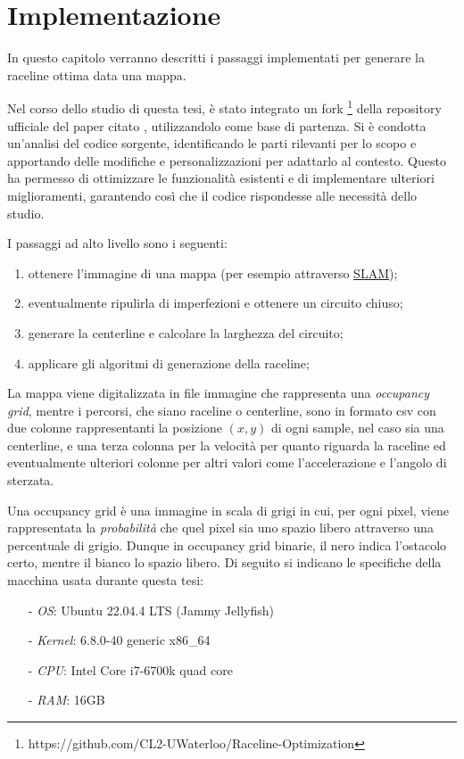 
\chapter{Implementazione}
\label{chap:impl}
In questo capitolo verranno descritti i passaggi implementati per generare la raceline ottima data una
mappa.

Nel corso dello studio di questa tesi, è stato integrato un fork
\footnote{https://github.com/CL2-UWaterloo/Raceline-Optimization} della repository ufficiale del paper
citato \cite{christ2021time}, utilizzandolo come base di partenza. Si è condotta un'analisi del codice
sorgente, identificando le parti rilevanti per lo scopo e apportando delle modifiche e
personalizzazioni per adattarlo al contesto. Questo ha permesso di ottimizzare le funzionalità
esistenti e di implementare ulteriori miglioramenti, garantendo così che il codice rispondesse alle
necessità dello studio.

\bigskip
\noindent I passaggi ad alto livello sono i seguenti:
\begin{enumerate}
	\item ottenere l'immagine di una mappa (per esempio attraverso \hyperref[par:slam]{SLAM});
	\item eventualmente ripulirla di imperfezioni e ottenere un circuito chiuso; 
	\item generare la centerline e calcolare la larghezza del circuito;
	\item applicare gli algoritmi di generazione della raceline;
\end{enumerate}
La mappa viene digitalizzata in file immagine che rappresenta una \textit{occupancy grid}, mentre i
percorsi, che siano raceline o centerline, sono in formato csv con due colonne rappresentanti la
posizione $(x,y)$ di ogni sample, nel caso sia una centerline, e una terza colonna per la velocità per
quanto riguarda la raceline ed eventualmente ulteriori colonne per altri valori come l'accelerazione e
l'angolo di sterzata.

Una occupancy grid è una immagine in scala di grigi in cui, per ogni pixel, viene rappresentata la
\textit{probabilità} che quel pixel sia uno spazio libero attraverso una percentuale di grigio. Dunque in
occupancy grid binarie, il nero indica l'ostacolo certo, mentre il bianco lo spazio libero.
\newpage
Di seguito si indicano le specifiche della macchina usata durante questa tesi:
\begin{itemize}
	\item[-] \textit{OS}: Ubuntu 22.04.4 LTS (Jammy Jellyfish)
	\item[-] \textit{Kernel}: 6.8.0-40 generic x86\_64
	\item[-] \textit{CPU}: Intel Core i7-6700k quad core
	\item[-] \textit{RAM}: 16GB
\end{itemize}

